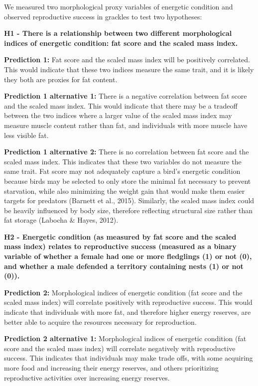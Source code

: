 \documentclass[
]{article}
\begin{document}
We measured two morphological proxy variables of energetic condition and
observed reproductive success in grackles to test two hypotheses:

\textbf{H1 - There is a relationship between two different morphological
indices of energetic condition: fat score and the scaled mass index.}

\textbf{Prediction 1:} Fat score and the scaled mass index will be
positively correlated. This would indicate that these two indices
measure the same trait, and it is likely they both are proxies for fat
content.

\textbf{Prediction 1 alternative 1:} There is a negative correlation
between fat score and the scaled mass index. This would indicate that
there may be a tradeoff between the two indices where a larger value of
the scaled mass index may measure muscle content rather than fat, and
individuals with more muscle have less visible fat.

\textbf{Prediction 1 alternative 2:} There is no correlation between fat
score and the scaled mass index. This indicates that these two variables
do not measure the same trait. Fat score may not adequately capture a
bird's energetic condition because birds may be selected to only store
the minimal fat necessary to prevent starvation, while also minimizing
the weight gain that would make them easier targets for predators
(Barnett et al., 2015). Similarly, the scaled mass index could be
heavily influenced by body size, therefore reflecting structural size
rather than fat storage (Labocha \& Hayes, 2012).

\textbf{H2 - Energetic condition (as measured by fat score and the
scaled mass index) relates to reproductive success (measured as a binary
variable of whether a female had one or more fledglings (1) or not (0),
and whether a male defended a territory containing nests (1) or not
(0)).}

\textbf{Prediction 2:} Morphological indices of energetic condition (fat
score and the scaled mass index) will correlate positively with
reproductive success. This would indicate that individuals with more
fat, and therefore higher energy reserves, are better able to acquire
the resources necessary for reproduction.

\textbf{Prediction 2 alternative 1:} Morphological indices of energetic
condition (fat score and the scaled mass index) will correlate
negatively with reproductive success. This indicates that individuals
may make trade offs, with some acquiring more food and increasing their
energy reserves, and others prioritizing reproductive activities over
increasing energy reserves.
\end{document}
